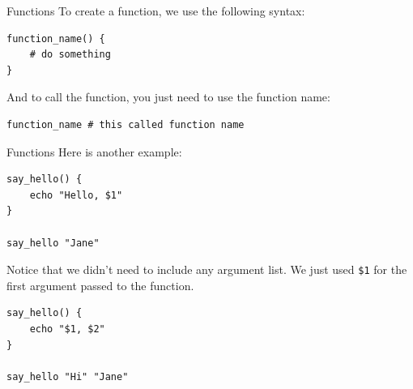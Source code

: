 \documentclass[10pt]{beamer}
\begin{document}
\begin{frame}[label={sec:orgda543b3},fragile]{Functions}
 To create a function, we use the following syntax:

\begin{verbatim}
function_name() {
    # do something
}
\end{verbatim}

And to call the function, you just need to use the function name:

\begin{verbatim}
function_name # this called function name
\end{verbatim}
\end{frame}

\begin{frame}[label={sec:org4a65f05},fragile]{Functions}
 Here is another example:

\begin{verbatim}
say_hello() {
    echo "Hello, $1"
}

say_hello "Jane"
\end{verbatim}

Notice that we didn't need to include any argument list. We just used \texttt{\$1} for the
first argument passed to the function.

\begin{verbatim}
say_hello() {
    echo "$1, $2"
}

say_hello "Hi" "Jane"
\end{verbatim}
\end{frame}
\end{document}
